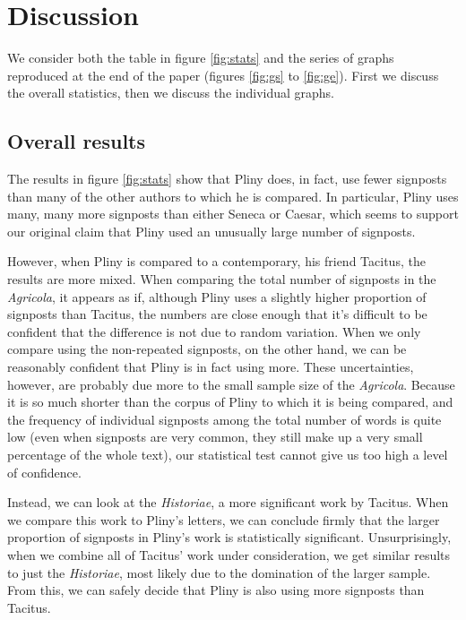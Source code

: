 \section{Discussion}
\label{sec:discuss}

We consider both the table in figure \ref{fig:stats} and the series of graphs reproduced at the end of the paper (figures \ref{fig:gs} to \ref{fig:ge}). First we discuss the overall statistics, then we discuss the individual graphs.

\subsection{Overall results}

The results in figure \ref{fig:stats} show that Pliny does, in fact, use fewer signposts than many of the other authors to which he is compared. In particular, Pliny uses many, many more signposts than either Seneca or Caesar, which seems to support our original claim that Pliny used an unusually large number of signposts.

However, when Pliny is compared to a contemporary, his friend Tacitus, the results are more mixed. When comparing the total number of signposts in the \textit{Agricola}, it appears as if, although Pliny uses a slightly higher proportion of signposts than Tacitus, the numbers are close enough that it's difficult to be confident that the difference is not due to random variation. When we only compare using the non-repeated signposts, on the other hand, we can be reasonably confident that Pliny is in fact using more. These uncertainties, however, are probably due more to the small sample size of the \textit{Agricola}. Because it is so much shorter than the corpus of Pliny to which it is being compared, and the frequency of individual signposts among the total number of words is quite low (even when signposts are very common, they still make up a very small percentage of the whole text), our statistical test cannot give us too high a level of confidence. 

Instead, we can look at the \textit{Historiae}, a more significant work by Tacitus. When we compare this work to Pliny's letters, we can conclude firmly that the larger proportion of signposts in Pliny's work is statistically significant. Unsurprisingly, when we combine all of Tacitus' work under consideration, we get similar results to just the \textit{Historiae}, most likely due to the domination of the larger sample. From this, we can safely decide that Pliny is also using more signposts than Tacitus.

